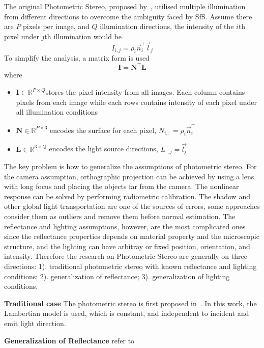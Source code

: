 The original Photometric Stereo, proposed by~\citeauthor{woodham1980photometric}, utilised multiple illumination from different directions to overcome the ambiguity faced by SfS. Assume there are $P$ pixels per image, and $Q$ illumination directions, the intensity of the $i$th pixel under $j$th illumination would be
$$
I_{i,j}=\rho_i\vec{n}_i^\top \vec{l}_j
$$
To simplify the analysis, a matrix form is used
$$
\mathbf{I} = \mathbf{N}^\top \mathbf{L}
$$
where
\begin{itemize}
\item $\mathbf{I}\in \mathbb{R}^{P\times Q} $stores the pixel intensity from all images. Each column contains pixels from each image while each rows contains intensity of each pixel under all illumination conditions
\item $\mathbf{N}\in \mathbb{R}^{P\times3}$ encodes the surface for each pixel, \ie $N_{i, :} = \rho_i\vec{n}_i^\top$
\item $\mathbf{L} \in \mathbb{R}^{3\times Q}$ encodes the light source directions, \ie $L_{:, j} = \vec{l_j}$
\end{itemize}

The key problem is how to generalize the assumptions of photometric stereo. For the camera assumption, orthographic projection can be achieved by using a lens with long focus and placing the objects far from the camera. The nonlinear response can be solved by performing radiometric calibration. The shadow and other global light transportation are one of the sources of errors, some approaches consider them as outliers and remove them before normal estimation. The reflectance and lighting assumptions, however, are the most complicated ones since the reflectance properties depends on material property and the microscopic structure, and the lighting can have arbitray or fixed position, orientation, and intensity. Therefore the research on Photometric Stereo are generally on three directions: 1). traditional photometric stereo with known reflectance and lighting conditions; 2). generalization of reflectance; 3). generalization of lighting conditions.

\textbf{Traditional case} The photometric stereo is first proposed in~\cite{woodham1980photometric}. In this work, the Lambertian model is used, which is constant, and independent to incident and emit light direction.

\textbf{Generalization of Reflectance}
refer to \cite{alldrin2008photometric}

